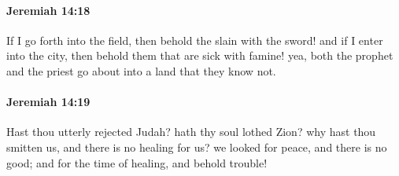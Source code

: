 		\paragraph{Jeremiah 14:18} %
			\label{JEREMIAH-14-18}

			If I go forth into the field, then behold the slain with the sword! and if I enter into the city, then behold them that are sick with famine! yea, both the prophet and the priest go about into a land that they know not.


		\paragraph{Jeremiah 14:19} %
			\label{JEREMIAH-14-19}

			Hast thou utterly rejected Judah? hath thy soul lothed Zion? why hast thou smitten us, and there is no healing for us? we looked for peace, and there is no good; and for the time of healing, and behold trouble!


